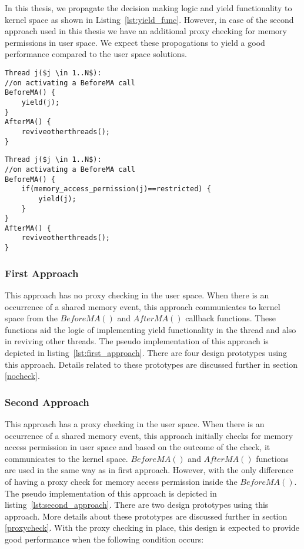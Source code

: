 In this thesis, we propagate the decision making logic and yield functionality to kernel space as shown in Listing~\ref{lst:yield_func}. 
However, in case of the second approach used in this thesis we have an additional proxy checking for memory permissions in user space. 
We expect these propogations to yield a good performance compared to the user space solutions. 

\noindent\begin{minipage}{.45\textwidth}
\begin{lstlisting}[mathescape=true,style=customc,caption={First Approach},frame=tlrb,label={lst:first_approach}]
Thread j($j \in 1..N$): 
//on activating a BeforeMA call
BeforeMA() {
	yield(j);
}
AfterMA() {
	reviveotherthreads();
}
\end{lstlisting}
\end{minipage}\hfill
\begin{minipage}{.45\textwidth}
\begin{lstlisting}[mathescape=true,style=customc,caption={Second Approach},frame=tlrb,label={lst:second_approach}]
Thread j($j \in 1..N$): 
//on activating a BeforeMA call
BeforeMA() {
	if(memory_access_permission(j)==restricted) {
		yield(j);
	}
}
AfterMA() {
	reviveotherthreads();
}
\end{lstlisting}
\end{minipage}


\subsubsection{First Approach \label{fir_app}}

This approach has no proxy checking in the user space. 
When there is an occurrence of a shared memory event, this approach communicates to kernel space from the $BeforeMA()$ and $AfterMA()$ callback functions. 
These functions aid the logic of implementing yield functionality in the thread and also in reviving other threads. 
The pseudo implementation of this approach is depicted in listing~\ref{lst:first_approach}.
There are four design prototypes using this approach. 
Details related to these prototypes are discussed further in section \ref{nocheck}.

\subsubsection{Second Approach \label{sec_app}}

This approach has a proxy checking in the user space. 
When there is an occurrence of a shared memory event, this approach initially checks for memory access permission in user space and based on the outcome of the check, it communicates to the kernel space. 
$BeforeMA()$ and $AfterMA()$ functions are used in the same way as in first approach. 
However, with the only difference of having a proxy check for memory access permission inside the $BeforeMA()$. 
The pseudo implementation of this approach is depicted in listing~\ref{lst:second_approach}.
There are two design prototypes using this approach. More details about these prototypes are discussed further in section \ref{proxycheck}.
With the proxy checking in place, this design is expected to provide good performance when the following condition occurs: 

